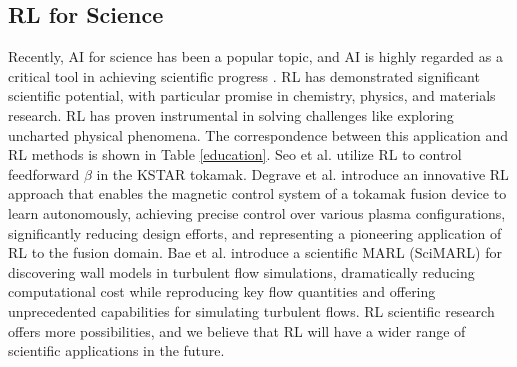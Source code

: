 \documentclass[acmsmall]{acmart}
\begin{document}
\subsection{RL for Science}
Recently, AI for science has been a popular topic, and AI is highly regarded as a critical tool in achieving scientific progress \cite{9966863}. RL has demonstrated significant scientific potential, with particular promise in chemistry, physics, and materials research. RL has proven instrumental in solving challenges like exploring uncharted physical phenomena. The correspondence between this application and RL methods is shown in Table \ref{education}.
Seo et al. \cite{seo2021feedforward} utilize RL to control feedforward $\beta$ in the KSTAR tokamak.
Degrave et al. \cite{Degrave2022} introduce an innovative RL approach that enables the magnetic control system of a tokamak fusion device to learn autonomously, achieving precise control over various plasma configurations, significantly reducing design efforts, and representing a pioneering application of RL to the fusion domain.
Bae et al. \cite{Bae2022} introduce a scientific MARL (SciMARL) for discovering wall models in turbulent flow simulations, dramatically reducing computational cost while reproducing key flow quantities and offering unprecedented capabilities for simulating turbulent flows.
RL scientific research offers more possibilities, and we believe that RL will have a wider range of scientific applications in the future.


\end{document}
